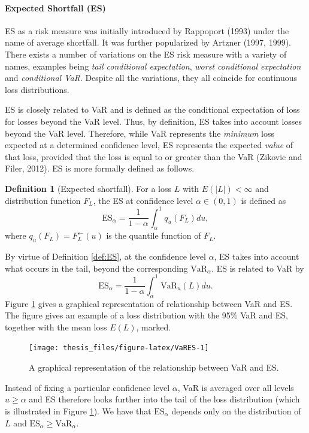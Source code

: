 \documentclass[a4paper,11pt]{article}
\theoremstyle{definition}
\newtheorem{definition}{Definition}[section]
\theoremstyle{definition}
\theoremstyle{definition}
\theoremstyle{definition}
\theoremstyle{remark}
\begin{document}
\hypertarget{expected-shortfall-es}{%
\paragraph{Expected Shortfall (ES)}\label{expected-shortfall-es}}

ES as a risk measure was initially introduced by Rappoport (1993) under the name of average shortfall. It was further popularized by Artzner (1997, 1999). There exists a number of variations on the ES risk measure with a variety of names, examples being \emph{tail conditional expectation}, \emph{worst conditional expectation} and \emph{conditional VaR}. Despite all the variations, they all coincide for continuous loss distributions.

ES is closely related to VaR and is defined as the conditional expectation of loss for losses beyond the VaR level. Thus, by definition, ES takes into account losses beyond the VaR level. Therefore, while VaR represents the \emph{minimum} loss expected at a determined confidence level, ES represents the expected \emph{value} of that loss, provided that the loss is equal to or greater than the VaR (Zikovic and Filer, 2012). ES is more formally defined as follows.
\begin{definition}[Expected shortfall]
\protect\hypertarget{def:ES}{}{\label{def:ES} {} }
For a loss \(L\) with \(E(\vert L \vert) < \infty\) and distribution function \(F_L\), the ES at confidence level \(\alpha \in (0,1)\) is defined as
\begin{equation}
\text{ES}_{\alpha} = \frac{1}{1-\alpha} \int_{\alpha}^{1} q_u (F_L) du,
\label{eq:ES}
\end{equation}
where \(q_u (F_L) = F_{L}^{\leftarrow}(u)\) is the quantile function of \(F_L\).
\end{definition}
By virtue of Definition \ref{def:ES}, at the confidence level \(\alpha\), ES takes into account what occurs in the tail, beyond the corresponding \(\text{VaR}_{\alpha}\). ES is related to VaR by
\begin{equation}
\text{ES}_{\alpha} = \frac{1}{1-\alpha} \int_{\alpha}^{1} \text{VaR}_u (L) du.
\label{eq:ESVaR}
\end{equation}
Figure \ref{fig:VaRES} gives a graphical representation of relationship between VaR and ES. The figure gives an example of a loss distribution with the 95\% VaR and ES, together with the mean loss \(E(L)\), marked.
\begin{figure}[H]

{\centering \texttt{[image: thesis\_files/figure-latex/VaRES-1]} 

}

\caption{A graphical representation of the relationship between VaR and ES.}\label{fig:VaRES}
\end{figure}
Instead of fixing a particular confidence level \(\alpha\), VaR is averaged over all levels \(u \geq \alpha\) and ES therefore looks further into the tail of the loss distribution (which is illustrated in Figure \ref{fig:VaRES}). We have that \(\text{ES}_{\alpha}\) depends only on the distribution of \(L\) and \(\text{ES}_{\alpha} \geq \text{VaR}_{\alpha}\).
\end{document}
